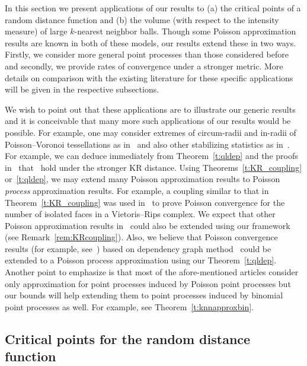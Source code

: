 \documentclass[AHL,Unicode,longabstracts]{cedram}
\begin{document}
In this section we present applications of our results to (a) the critical points of a random distance function and (b) {the volume (with respect to the intensity measure) of large $k$-nearest neighbor balls.} Though some Poisson approximation results are known in both of these models, our results extend these in two ways. Firstly, we consider more general point processes than those considered before and secondly, we provide rates of convergence under a stronger metric. More details on comparison with the existing literature for these specific applications will be given in the respective subsections.

We wish to point out that these applications are to illustrate our generic results and it is conceivable that many more such applications of our results would be possible. For example, one may consider extremes of circum-radii and in-radii of Poisson--Voronoi tessellations as in~\cite{Calkaextreme2014,Chenaviertessellations2014,PianoforteSchulte2021} and also other stabilizing statistics as in~\cite{Otto2020}. For example, we can deduce immediately from Theorem~\ref{t:qldep} and the proofs in~\cite{Otto2020} that~\cite[Theorems~4.2, 5.5 and~6.5]{Otto2020} hold under the stronger KR distance. Using Theorems~\ref{t:KR_coupling} or~\ref{t:qldep}, we may extend many Poisson approximation results to Poisson \emph{process} approximation results. For example, a coupling similar to that in Theorem~\ref{t:KR_coupling} was used in~\cite[Theorem~2.8]{Iyer2020} to prove Poisson convergence for the number of isolated faces in a Vietoris--Rips complex. We expect that other Poisson approximation results in~\cite{penrose_inhomogeneous_2018} could also be extended using our framework (see Remark~\ref{rem:KRcoupling}). Also, we believe that Poisson convergence results (for example, see~\cite[Theorem~2.1]{Owada2017}) based on dependency graph method~\cite{Arratia1989} could be extended to a Poisson process approximation using our Theorem~\ref{t:qldep}. Another point to emphasize is that most of the afore-mentioned articles consider only approximation for point processes induced by Poisson point processes but our bounds will help extending them to point processes induced by binomial point processes as well. For example, see Theorem~\ref{t:knnapproxbin}.

\subsection{Critical points for the random distance function}\label{s:critpoint_dist}
\end{document}
